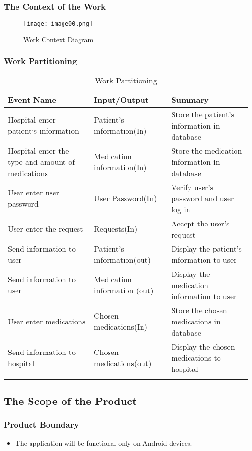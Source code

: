 \documentclass[12pt]{article}
\begin{document}
\subsubsection{The Context of the Work}
\newpage
\vfill
\begin{figure}[ht]
  \texttt{[image: image00.png]}
  \caption{Work Context Diagram}
  \label{fig:Work Context Diagram}
\end{figure}
\vfill

\subsubsection{Work Partitioning}
\begin{longtable}{|p{5cm}|p{5cm}|p{5cm}|}
\hline
Event Name & Input/Output & Summary \\
\hline
Hospital enter patient’s information  & Patient’s information(In) & Store the patient’s information in database \\
\hline
Hospital enter the type and amount of medications & Medication information(In) & Store the medication information in database \\
\hline
User enter user password & User Password(In) & Verify user’s password and user log in \\
\hline
User enter the request & Requests(In) & Accept the user’s request \\
\hline
Send information to user & Patient’s information(out) & Display the patient's information to user \\
\hline
Send information to user & Medication information (out) & Display the medication information to user \\
\hline
User enter medications & Chosen medications(In) & Store the chosen medications in database \\
\hline
Send information to hospital  & Chosen medications(out) & Display the chosen medications to hospital \\

\caption{Work Partitioning}
\label{tab:workpartition}
\end{longtable}

\subsection{The Scope of the Product}
\subsubsection{Product Boundary}
\begin{itemize}
\item The application will be functional only on Android devices.
\end{itemize}
\end{document}
